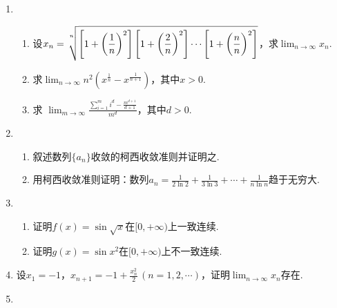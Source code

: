 \documentclass{article}
\begin{document}
\begin{enumerate}
\item
\begin{enumerate}
\item
设$\displaystyle x_n=\sqrt[\uproot{10}n]{\left[1+\left(\frac{1}{n}\right)^2\right]\left[1+\left(\frac{2}{n}\right)^2\right]\cdots\left[1+\bigg(\frac{n}{n}\bigg)^2\right]}$，求$\displaystyle\lim_{n\to\infty}x_n$.
\item
求$\displaystyle\lim_{n\to\infty}n^2\left(x^{\frac{1}{n}}-x^{\frac{1}{n+1}}\right)$，其中$x>0$.
\item
求 $\displaystyle \lim_{m\to\infty}\frac{\displaystyle\sum_{i=1}^{m}i^d-\frac{m^{d+1}}{d+1}}{\displaystyle m^d}$，其中$d>0$.
\end{enumerate}
\item
\begin{enumerate}
\item
叙述数列$\{a_n\}$收敛的柯西收敛准则并证明之.
\item
用柯西收敛准则证明：数列$\displaystyle a_n=\frac{1}{2\ln 2}+\frac{1}{3\ln 3}+\cdots+\frac{1}{n\ln n}$趋于无穷大.
\end{enumerate}
\item
\begin{enumerate}
\item
证明$f(x)=\sin\sqrt{x}$在$[0,+\infty)$上一致连续.
\item
证明$g(x)=\sin x^2$在$[0,+\infty)$上不一致连续.
\end{enumerate}
\item
设$x_1=-1$，$\displaystyle x_{n+1}=-1+\frac{x_n^2}{2}\,(n=1,2,\cdots)$，证明$\displaystyle \lim_{n\to\infty}x_n$存在.
\item

\end{enumerate}
\end{document}
